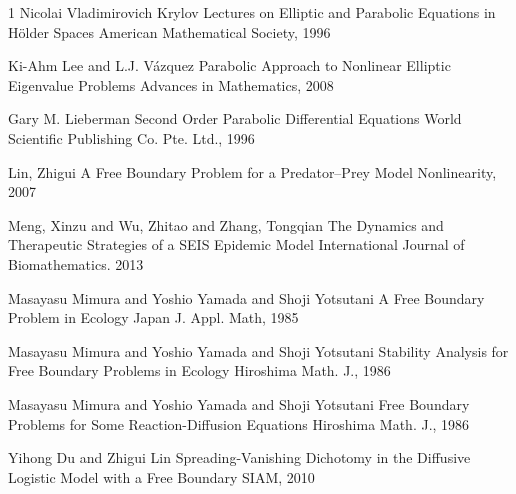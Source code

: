 \documentclass[11pt]{amsart}
\numberwithin{equation}{section}
\theoremstyle{plain}
\theoremstyle{definition}
\begin{document}
\begin{thebibliography}{1}
Nicolai Vladimirovich Krylov
Lectures on Elliptic and Parabolic Equations in H\"older Spaces
American Mathematical Society, 1996

Ki-Ahm Lee and L.J. Vázquez
Parabolic Approach to Nonlinear Elliptic Eigenvalue Problems
Advances in Mathematics, 2008

Gary M. Lieberman
Second Order Parabolic Differential Equations
World Scientific Publishing Co. Pte. Ltd., 1996

Lin, Zhigui
A Free Boundary Problem for a Predator--Prey Model
Nonlinearity, 2007

Meng, Xinzu and Wu, Zhitao and Zhang, Tongqian
The Dynamics and Therapeutic Strategies of a SEIS Epidemic Model
International Journal of Biomathematics. 2013

Masayasu Mimura and Yoshio Yamada and Shoji Yotsutani
A Free Boundary Problem in Ecology
Japan J. Appl. Math, 1985

Masayasu Mimura and Yoshio Yamada and Shoji Yotsutani
Stability Analysis for Free Boundary Problems in Ecology
Hiroshima Math. J., 1986

Masayasu Mimura and Yoshio Yamada and Shoji Yotsutani
Free Boundary Problems for Some Reaction-Diffusion Equations
Hiroshima Math. J., 1986

Yihong Du and Zhigui Lin
Spreading-Vanishing Dichotomy in the Diffusive Logistic Model with a Free Boundary
SIAM, 2010






\end{thebibliography}
\end{document}
